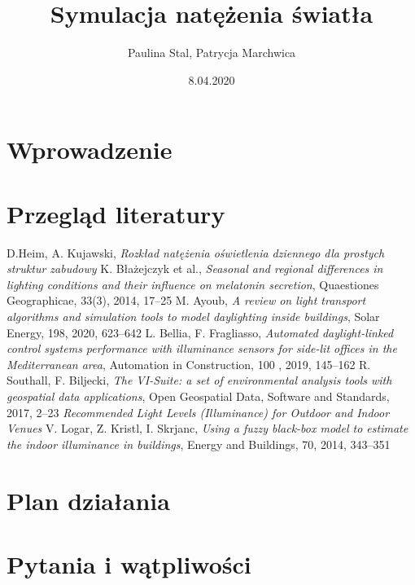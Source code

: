 \documentclass[a4paper,12pt]{article}
\title{Symulacja natężenia światła}
\author{Paulina Stal, Patrycja Marchwica}
\date{8.04.2020}
\begin{document}
\maketitle

	\section{Wprowadzenie}
	\label{sec:wprowadzenie}
	
	
	\section{Przegląd literatury}
	\label{sec:przeglad_literatury}
		\begin{thebibliography}{7}
			D.Heim, A. Kujawski, \textit{Rozkład natężenia oświetlenia dziennego dla prostych struktur zabudowy}
			K. Błażejczyk et al., \textit{Seasonal and regional differences in lighting conditions and their influence on melatonin secretion}, Quaestiones Geographicae, 33(3), 2014, 17--25
			M. Ayoub, \textit{A review on light transport algorithms and simulation tools to model daylighting inside buildings}, Solar Energy, 198, 2020, 623--642
			L. Bellia, F. Fragliasso, \textit{Automated daylight-linked control systems performance with illuminance sensors for side-lit offices in the Mediterranean area}, Automation in Construction, 100 , 2019, 145--162
			R. Southall, F. Biljecki, \textit{The VI-Suite: a set of environmental analysis tools with geospatial data applications}, Open Geospatial Data, Software and Standards, 2017, 2--23
			\textit{Recommended Light Levels (Illuminance) for Outdoor and Indoor Venues}
			V. Logar, Z. Kristl, I. Skrjanc, \textit{Using a fuzzy black-box model to estimate the indoor illuminance in buildings}, Energy and Buildings, 70, 2014, 343--351
			
		\end{thebibliography}
	
	\section{Plan działania}
	\label{sec:plan_dzialania}
	
	\section{Pytania i wątpliwości}
	\label{sec:pytania_watpliwosci}

	
\end{document}
